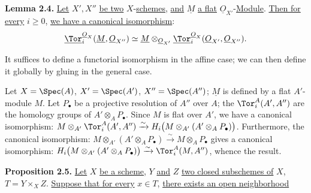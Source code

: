 \textbf{Lemma 2.4.} \uline{Let} \(X',X''\) \uline{be two} \(X\)-\uline{schemes}, \uline{and} \(\underline{M}\) \uline{a flat} \(\underline{O}_{X'}\)-\uline{Module}. \uline{Then for every} \(i\ge0\), \uline{we have a canonical isomorphism}:
\begin{equation}\notag
\underline{\Tor}_i^{\underline{O}_X}(\underline{M},\underline{O}_{X''})\simeq
\underline{M}\otimes_{\underline{O}_{X'}}\underline{\Tor}_i^{\underline{O}_X}(\underline{O}_{X'},\underline{O}_{X''}).
\end{equation}

It suffices to define a functorial isomorphism in the affine case; we can then define it globally by gluing in the general case.

Let \(X=\Spec(A)\), \(X'=\Spec(A')\), \(X''=\Spec(A'')\); \(\underline{M}\) is defined by a flat \(A'\)-module \(M\). Let \(P_\bullet\) be a projective resolution of \(A''\) over \(A\); the \(\Tor_i^A(A',A'')\) are the homology groups of \(A'\otimes_A P_\bullet\). Since \(M\) is flat over \(A'\), we have a canonical isomorphism: \(M\otimes_{A'}\Tor_i^A(A',A'')\xrightarrow{\sim}H_i\bigl(M\otimes_{A'}(A'\otimes_A P_\bullet)\bigr)\). Furthermore, the canonical isomorphism: \(M\otimes_{A'}(A'\otimes_A P_\bullet)\xrightarrow{\sim}M\otimes_A P_\bullet\) gives a canonical isomorphism: \(H_i\bigl(M\otimes_{A'}(A'\otimes_A P_\bullet)\bigr)\xrightarrow{\sim}\Tor_i^A(M,A'')\), whence the result.

\textbf{Proposition 2.5.} \uline{Let} \(X\) \uline{be a scheme}, \(Y\) \uline{and} \(Z\) \uline{two closed subschemes of} \(X\), \(T=Y\times_X Z\). \uline{Suppose that for every} \(x\in T\), \uline{there exists an open neighborhood}
